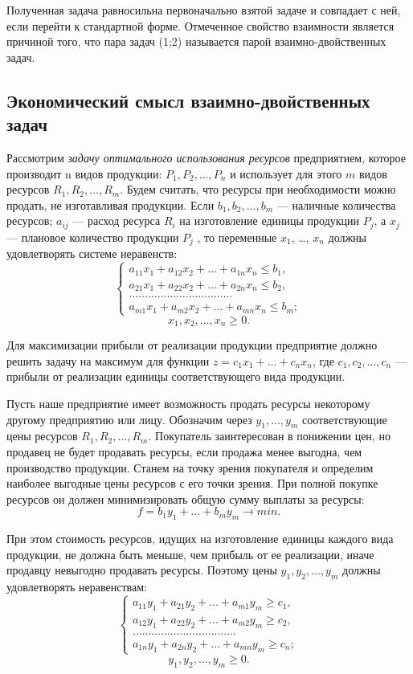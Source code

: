 Полученная задача равносильна первоначально взятой задаче и совпадает с ней, если перейти к стандартной форме. Отмеченное свойство взаимности является причиной того, что пара задач (1;2) называется парой взаимно-двойственных задач.

\subsection{Экономический смысл взаимно-двойственных задач}

Рассмотрим \textit{задачу оптимального использования ресурсов} предприятием, которое производит n видов продукции:  $P_1, P_2, \ldots , P_n$ и использует для этого $m$ видов ресурсов $R_1, R_2, \ldots, R_m$. Будем считать, что ресурсы при необходимости можно продать, не изготавливая продукции. Если  $b_1, b_2 , \ldots, b_m$ --- наличные количества ресурсов;
$a_{ij}$ --- расход ресурса $R_i$ на изготовление единицы продукции $P_j$, а $x_j$ — плановое количество продукции $P_j$ , то переменные $x_1$, \ldots, $x_n$  должны удовлетворять системе неравенств:
\[
\begin{cases}
a_{11}x_1 + a_{12}x_2 + \ldots + a_{1n}x_n \le b_1, \\
a_{21}x_1 + a_{22}x_2 + \ldots + a_{2n}x_n \le b_2, \\
\ldots\ldots\ldots\ldots\ldots\ldots\ldots\ldots\ldots\ldots\ldots \\
a_{m1}x_1 + a_{m2}x_2 + \ldots + a_{mn}x_n \le b_m;
\end{cases}
\]
\[
x_1, x_2, \ldots, x_n \ge 0.
\]

Для максимизации прибыли от реализации продукции предприятие должно решить задачу на максимум для функции $z = c_1x_1 + \ldots + c_nx_n$, где  $c_1, c_2, \ldots, c_n$ — прибыли от реализации единицы соответствующего вида  продукции.

Пусть наше предприятие имеет возможность продать ресурсы некоторому другому предприятию или лицу.  Обозначим через
$y_1, \ldots, y_m$ соответствующие цены ресурсов $R_1, R_2, \ldots, R_m$.  Покупатель заинтересован в понижении цен, но продавец не будет продавать ресурсы, если продажа менее выгодна, чем  производство  продукции.  Станем на точку зрения покупателя и определим наиболее выгодные цены ресурсов с его точки зрения. При полной покупке ресурсов он должен минимизировать общую сумму выплаты за ресурсы:
\[
f = b_1y_1 + \ldots + b_my_m \rightarrow min.
\]

При этом стоимость ресурсов, идущих на изготовление единицы каждого вида продукции, не должна быть меньше, чем прибыль от ее реализации, иначе продавцу невыгодно продавать ресурсы. Поэтому цены $y_1, y_2, \ldots, y_m$ должны удовлетворять неравенствам:
\[
\begin{cases}
a_{11}y_1 + a_{21}y_2 + \ldots + a_{m1}y_m \ge c_1, \\
a_{12}y_1 + a_{22}y_2 + \ldots + a_{m2}y_m \ge c_2, \\
\ldots\ldots\ldots\ldots\ldots\ldots\ldots\ldots\ldots\ldots\ldots \\
a_{1n}y_1 + a_{2n}y_2 + \ldots + a_{mn}y_m \ge c_n;
\end{cases}
\]
\[
y_1, y_2, \ldots, y_m \ge 0.
\]

